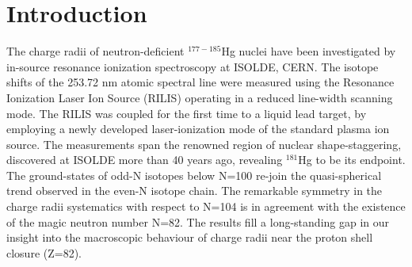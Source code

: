 \section{Introduction}
The charge radii of neutron-deficient $^{177-185}$Hg nuclei have been investigated by in-source resonance ionization spectroscopy at ISOLDE, CERN.  The isotope shifts of the 253.72 nm atomic spectral line were measured using the Resonance Ionization Laser Ion Source (RILIS) operating in a reduced line-width scanning mode.  The RILIS was coupled for the first time to a liquid lead target, by employing a newly developed laser-ionization mode of the standard plasma ion source. The measurements span the renowned region of nuclear shape-staggering, discovered at ISOLDE more than 40 years ago, revealing $^{181}$Hg to be its endpoint. The ground-states of odd-N isotopes below N=100 re-join the quasi-spherical trend observed in the even-N isotope chain.  The remarkable symmetry in the charge radii systematics with respect to N=104 is in agreement with the existence of the magic neutron number N=82. The results fill a long-standing gap in our insight into the macroscopic behaviour of charge radii near the proton shell closure (Z=82).